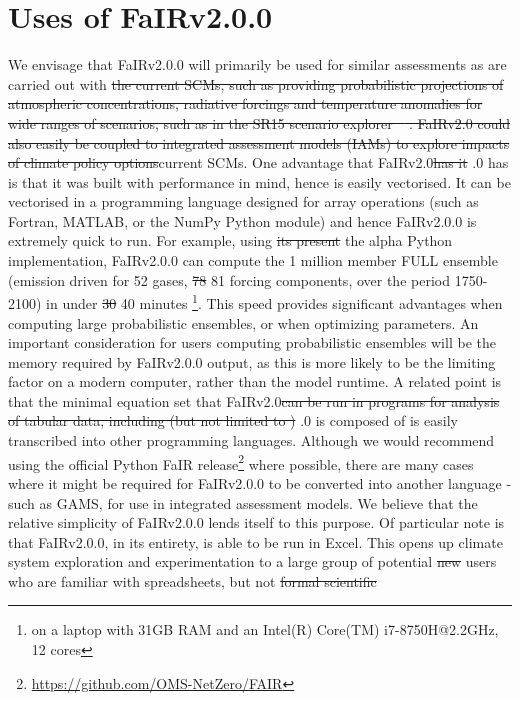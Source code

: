 \documentclass[gmd, manuscript]{copernicus}
\providecommand{\DIFadd}[1]{{\protect\color{blue}#1}} %
\providecommand{\DIFdel}[1]{{\protect\color{red}\sout{#1}}}                      %
\providecommand{\DIFaddbegin}{} %
\providecommand{\DIFaddend}{} %
\providecommand{\DIFdelbegin}{} %
\providecommand{\DIFdelend}{} %
\begin{document}
\section{Uses of FaIRv2.0\DIFaddbegin \DIFadd{.0}\DIFaddend } \label{FaIR_uses}
We envisage that FaIRv2.0\DIFaddbegin \DIFadd{.0 }\DIFaddend will primarily be used for similar assessments as are carried out with \DIFdelbegin \DIFdel{the current SCMs, such as providing probabilistic projections of atmospheric concentrations, radiative forcings and temperature anomalies for wide ranges of scenarios, such as in the SR15 scenario explorer \mbox{%
\citep{Huppmann:2018:scenario-data}}\hspace{0pt}%
. FaIRv2.0 could also easily be coupled to integrated assessment models (IAMs) to explore impacts of climate policy options}\DIFdelend \DIFaddbegin \DIFadd{current SCMs}\DIFaddend . One advantage that FaIRv2.0\DIFdelbegin \DIFdel{has it }\DIFdelend \DIFaddbegin \DIFadd{.0 has is }\DIFaddend that it was built with performance in mind, hence is easily vectorised. It can be vectorised in a programming language designed for array operations (such as Fortran, MATLAB, or the NumPy Python module) and hence FaIRv2.0\DIFaddbegin \DIFadd{.0 }\DIFaddend is extremely quick to run. For example, using \DIFdelbegin \DIFdel{its present }\DIFdelend \DIFaddbegin \DIFadd{the alpha }\DIFaddend Python implementation, FaIRv2.0\DIFaddbegin \DIFadd{.0 }\DIFaddend can compute the 1 million member FULL ensemble (emission driven for 52 gases, \DIFdelbegin \DIFdel{78 }\DIFdelend \DIFaddbegin \DIFadd{81 }\DIFaddend forcing components, over the period 1750-2100) in under \DIFdelbegin \DIFdel{30 }\DIFdelend \DIFaddbegin \DIFadd{40 }\DIFaddend minutes \footnote{on a laptop with 31GB RAM and an Intel(R) Core(TM) i7-8750H@2.2GHz, 12 cores}. This speed provides significant advantages when computing large probabilistic ensembles, or when optimizing parameters. An important consideration for users computing probabilistic ensembles will be the memory required by FaIRv2.0\DIFaddbegin \DIFadd{.0 }\DIFaddend output, as this is more likely to be the limiting factor on a modern computer, rather than the model runtime. A related point is that \DIFaddbegin \DIFadd{the minimal equation set that }\DIFaddend FaIRv2.0\DIFdelbegin \DIFdel{can be run in programs for analysis of tabular data, including (but not limited to ) }\DIFdelend \DIFaddbegin \DIFadd{.0 is composed of is easily transcribed into other programming languages. Although we would recommend using the official Python FaIR release}\footnote{\url{https://github.com/OMS-NetZero/FAIR}} \DIFadd{where possible, there are many cases where it might be required for FaIRv2.0.0 to be converted into another language - such as GAMS, for use in integrated assessment models. We believe that the relative simplicity of FaIRv2.0.0 lends itself to this purpose. Of particular note is that FaIRv2.0.0, in its entirety, is able to be run in }\DIFaddend Excel. This opens up climate system exploration \DIFaddbegin \DIFadd{and experimentation }\DIFaddend to a large group of potential \DIFdelbegin \DIFdel{new }\DIFdelend users who are familiar with spreadsheets, but not \DIFdelbegin \DIFdel{formal scientific }
\end{document}
